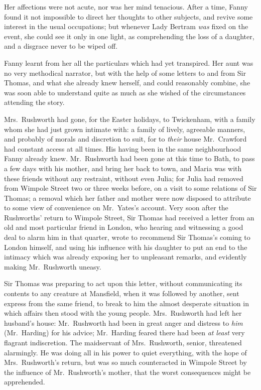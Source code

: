 Her affections were not acute, nor was her mind tenacious.
After a time, Fanny found it not impossible to direct
her thoughts to other subjects, and revive some interest
in the usual occupations; but whenever Lady Bertram \emph{was}
fixed on the event, she could see it only in one light,
as comprehending the loss of a daughter, and a disgrace
never to be wiped off.

Fanny learnt from her all the particulars which had
yet transpired.  Her aunt was no very methodical narrator,
but with the help of some letters to and from Sir Thomas,
and what she already knew herself, and could reasonably
combine, she was soon able to understand quite as much
as she wished of the circumstances attending the story.

Mrs.\ Rushworth had gone, for the Easter holidays,
to Twickenham, with a family whom she had just grown
intimate with:  a family of lively, agreeable manners,
and probably of morals and discretion to suit, for to \emph{their}
house Mr.\ Crawford had constant access at all times.
His having been in the same neighbourhood Fanny already knew.
Mr.\ Rushworth had been gone at this time to Bath, to pass
a few days with his mother, and bring her back to town,
and Maria was with these friends without any restraint,
without even Julia; for Julia had removed from Wimpole Street
two or three weeks before, on a visit to some relations
of Sir Thomas; a removal which her father and mother were
now disposed to attribute to some view of convenience
on Mr.\ Yates's account.  Very soon after the Rushworths'
return to Wimpole Street, Sir Thomas had received a
letter from an old and most particular friend in London,
who hearing and witnessing a good deal to alarm him
in that quarter, wrote to recommend Sir Thomas's coming
to London himself, and using his influence with his
daughter to put an end to the intimacy which was already
exposing her to unpleasant remarks, and evidently making
Mr.\ Rushworth uneasy.

Sir Thomas was preparing to act upon this letter, without
communicating its contents to any creature at Mansfield,
when it was followed by another, sent express from the
same friend, to break to him the almost desperate situation
in which affairs then stood with the young people.
Mrs.\ Rushworth had left her husband's house:  Mr.\ Rushworth
had been in great anger and distress to \emph{him} (Mr.\ Harding)
for his advice; Mr.\ Harding feared there had been \emph{at}
\emph{least} very flagrant indiscretion.  The maidservant
of Mrs.\ Rushworth, senior, threatened alarmingly.  He was
doing all in his power to quiet everything, with the hope
of Mrs.\ Rushworth's return, but was so much counteracted
in Wimpole Street by the influence of Mr.\ Rushworth's mother,
that the worst consequences might be apprehended.

